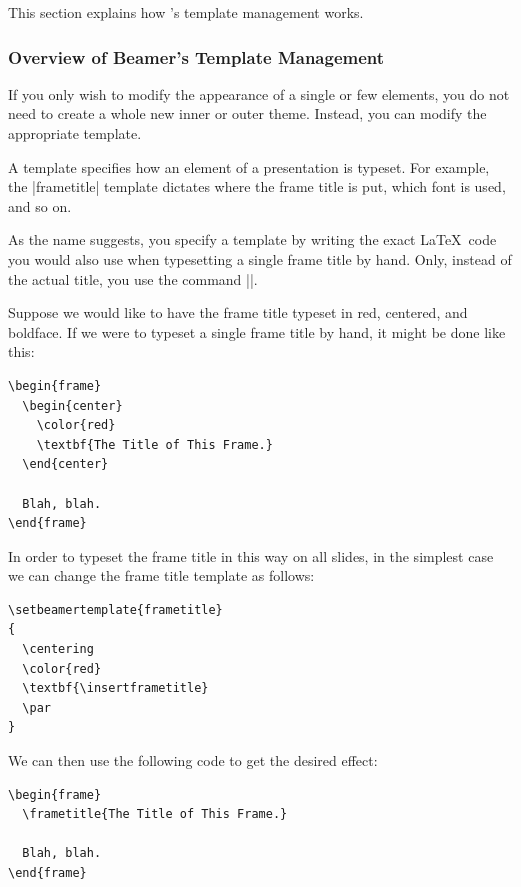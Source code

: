 This section explains how \beamer's template management works.

\subsubsection{Overview of Beamer's Template Management}

If you only wish to modify the appearance of a single or few elements, you do not need to create a whole new inner or outer theme. Instead, you can modify the appropriate template.

A template specifies how an element of a presentation is typeset. For example, the |frametitle| template dictates where the frame title is put, which font is used, and so on.

As the name suggests, you specify a template by writing the exact \LaTeX\ code you would also use when typesetting a single frame title by hand. Only, instead of the actual title, you use the command |\insertframetitle|.

\example
Suppose we would like to have the frame title typeset in red, centered, and boldface. If we were to typeset a single frame title by hand, it might be done like this:

\begin{verbatim}
\begin{frame}
  \begin{center}
    \color{red}
    \textbf{The Title of This Frame.}
  \end{center}

  Blah, blah.
\end{frame}
\end{verbatim}

In order to typeset the frame title in this way on all slides, in the simplest case we can change the frame title template as follows:

\begin{verbatim}
\setbeamertemplate{frametitle}
{
  \centering
  \color{red}
  \textbf{\insertframetitle}
  \par
}
\end{verbatim}
We can then use the following code to get the desired effect:
\begin{verbatim}
\begin{frame}
  \frametitle{The Title of This Frame.}

  Blah, blah.
\end{frame}
\end{verbatim}

